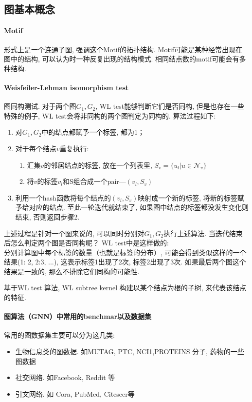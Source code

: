 \subsection{图基本概念}
\paragraph{Motif} 形式上是一个连通子图, 强调这个Motif的拓扑结构. Motif可能是某种经常出现在图中的结构, 可以认为时一种反复出现的结构模式. 相同结点数的motif可能会有多种结构. 

\paragraph{Weisfeiler-Lehman isomorphism test}  图同构测试. 对于两个图$G_1, G_2$, WL test能够判断它们是否同构, 但是也存在一些特殊的例子, WL test会将非同构的两个图判定为同构的. 算法过程如下: 
\begin{enumerate}
	\item 对$G_1, G_2$中的结点都赋予一个标签, 都为1；
	\item 对于每个结点$v$重复执行: 
	\begin{enumerate}
		\item 汇集$v$的邻居结点的标签, 放在一个列表里, $S_v = \{u_l | u \in \mathcal{N}_v \}$
		\item 将$v$的标签$v_l$和S组合成一个pair---$(v_l, S_v)$
	\end{enumerate}
	\item 利用一个hash函数将每个结点的$(v_l, S_v)$映射成一个新的标签, 将新的标签赋予给对应的结点. 至此一轮迭代就结束了, 如果图中结点的标签都没发生变化则结束, 否则返回步骤2.
\end{enumerate}
上述过程是针对一个图来说的, 可以同时分别对$G_1, G_2$执行上述算法. 
当迭代结束后怎么判定两个图是否同构呢？
WL test中是这样做的: \\
分别计算图中每个标签的数量（也就是标签的分布）, 可能会得到类似这样的一个结果(1: 2, 2:3, ...), 这表示标签1出现了2次, 标签2出现了3次. 如果最后两个图这个结果是一致的, 那么不排除它们同构的可能性. 

基于WL test 算法, WL subtree kernel\cite{shervashidze2011weisfeiler} 构建以某个结点为根的子树, 来代表该结点的特征. 

\paragraph{图算法（GNN）中常用的benchmar以及数据集} 常用的图数据集主要可以分为这几类: 
\begin{itemize}
	\item 生物信息类的图数据. 如MUTAG, PTC, NCI1,PROTEINS 分子, 药物的一些图数据
	\item 社交网络. 如Facebook, Reddit 等
	\item 引文网络. 如 Cora, PubMed, Citeseer等
\end{itemize}

